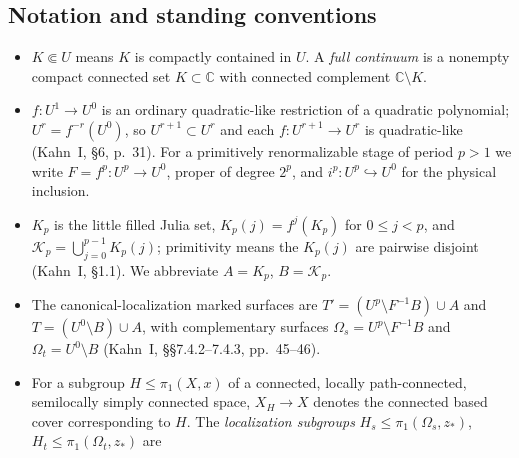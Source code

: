 \subsection*{Notation and standing conventions}

\begin{itemize}
\item \(K\Subset U\) means \(K\) is compactly contained in \(U\).  A
      \emph{full continuum} is a nonempty compact connected set
      \(K\subset\mathbb C\) with connected complement
      \(\mathbb C\setminus K\).
\item \(f:U^1\to U^0\) is an ordinary quadratic-like restriction of a
      quadratic polynomial; \(U^r=f^{-r}(U^0)\), so
      \(U^{r+1}\subset U^r\) and each \(f:U^{r+1}\to U^r\) is
      quadratic-like (Kahn~I, \S6, p.~31).  For a
      primitively renormalizable stage of period \(p>1\) we write
      \(F=f^p:U^p\to U^0\), proper of degree \(2^p\), and
      \(i^p:U^p\hookrightarrow U^0\) for the physical inclusion.
\item \(K_p\) is the little filled Julia set, \(K_p(j)=f^j(K_p)\) for
      \(0\le j<p\), and \(\mathcal K_p=\bigcup_{j=0}^{p-1}K_p(j)\);
      primitivity means the \(K_p(j)\) are pairwise disjoint (Kahn~I,
      \S1.1).  We abbreviate \(A=K_p\),
      \(B=\mathcal K_p\).
\item The canonical-localization marked surfaces are
      \(T'=(U^p\setminus F^{-1}B)\cup A\) and
      \(T=(U^0\setminus B)\cup A\), with complementary surfaces
      \(\Omega_s=U^p\setminus F^{-1}B\) and
      \(\Omega_t=U^0\setminus B\)
      (Kahn~I, \S\S7.4.2--7.4.3, pp.~45--46).
\item For a subgroup \(H\le\pi_1(X,x)\) of a connected, locally
      path-connected, semilocally simply connected space, \(X_H\to X\)
      denotes the connected based cover corresponding to \(H\).  The
      \emph{localization subgroups}
      \(H_s\le\pi_1(\Omega_s,z_*)\), \(H_t\le\pi_1(\Omega_t,z_*)\) are

\end{itemize}
